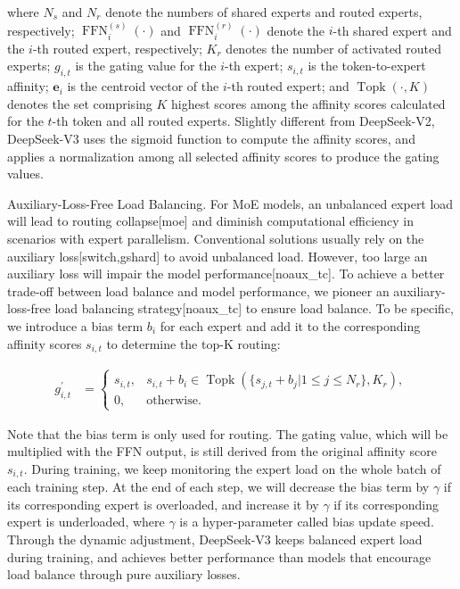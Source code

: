 \documentclass[11pt,a4paper]{article}
\begin{document}
where $N_{s}$ and $N_r$ denote the numbers of shared experts and routed experts, respectively; $\operatorname{FFN}^{(s)}_{i}(\cdot)$ and $\operatorname{FFN}^{(r)}_{i}(\cdot)$ denote the $i$-th shared expert and the $i$-th routed expert, respectively; $K_{r}$ denotes the number of activated routed experts; $g_{i,t}$ is the gating value for the $i$-th expert; $s_{i,t}$ is the token-to-expert affinity; $\mathbf{e}_{i}$ is the centroid vector of the $i$-th routed expert; and $\operatorname{Topk}(\cdot, K)$ denotes the set comprising $K$ highest scores among the affinity scores calculated for the $t$-th token and all routed experts. Slightly different from DeepSeek-V2, DeepSeek-V3 uses the sigmoid function to compute the affinity scores, and applies a normalization among all selected affinity scores to produce the gating values.

Auxiliary-Loss-Free Load Balancing. For MoE models, an unbalanced expert load will lead to routing collapse[moe] and diminish computational efficiency in scenarios with expert parallelism. Conventional solutions usually rely on the auxiliary loss[switch,gshard] to avoid unbalanced load. However, too large an auxiliary loss will impair the model performance[noaux\_tc]. To achieve a better trade-off between load balance and model performance, we pioneer an auxiliary-loss-free load balancing strategy[noaux\_tc] to ensure load balance. To be specific, we introduce a bias term $b_i$ for each expert and add it to the corresponding affinity scores $s_{i,t}$ to determine the top-K routing:

$$\begin{align}
    g^{\prime}_{i,t} & = \begin{cases} 
    s_{i,t}, & s_{i,t} + b_i \in \operatorname{Topk} (\{ s_{j, t} + b_j | 1 \leq j \leq N_r \}, K_{r}), \\
    0, & \text{otherwise}.
    \end{cases}
\end{align}$$

Note that the bias term is only used for routing. The gating value, which will be multiplied with the FFN output, is still derived from the original affinity score $s_{i,t}$. During training, we keep monitoring the expert load on the whole batch of each training step. At the end of each step, we will decrease the bias term by $\gamma$ if its corresponding expert is overloaded, and increase it by $\gamma$ if its corresponding expert is underloaded, where $\gamma$ is a hyper-parameter called bias update speed. Through the dynamic adjustment, DeepSeek-V3 keeps balanced expert load during training, and achieves better performance than models that encourage load balance through pure auxiliary losses.
\end{document}
